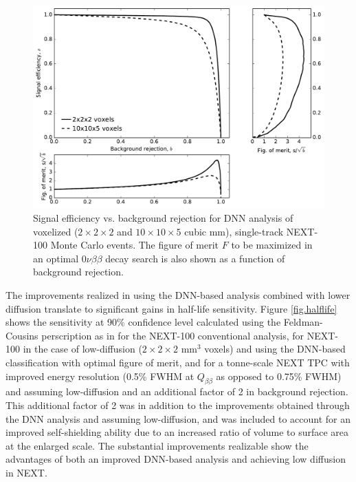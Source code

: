 \documentclass[a4paper,11pt]{article}
\begin{document}
\begin{figure}[!htb]
	\centering
	\includegraphics[scale=0.6]{fig/sigvsbg_DNN.pdf}
	\caption{\label{fig_svsb}Signal efficiency vs. background rejection for DNN analysis of voxelized ($2 \times 2 \times 2$ and $10 \times 10 \times 5$ cubic mm), single-track NEXT-100 Monte Carlo events.  The figure of
		merit $F$ to be maximized in an optimal $0\nu\beta\beta$ decay search is also shown as a function of background rejection.}
\end{figure}

The improvements realized in using the DNN-based analysis combined with lower diffusion translate to significant gains in half-life sensitivity.  Figure \ref{fig.halflife} shows the sensitivity at 90\% confidence level calculated using the Feldman-Cousins \cite{Feldman_1998} perscription as in \cite{NEXT_sensitivity} for the NEXT-100 conventional analysis, for NEXT-100 in the case of low-diffusion ($2 \times 2 \times 2$ mm$^3$ voxels) and using the DNN-based classification with optimal figure of merit, and for a tonne-scale NEXT TPC with improved energy resolution (0.5\% FWHM at $Q_{\beta\beta}$ as opposed to 0.75\% FWHM) and assuming low-diffusion and an additional factor of 2 in background rejection.  This additional factor of 2 was in addition to the improvements obtained through the DNN analysis and assuming low-diffusion, and was included to account for an improved self-shielding ability due to an increased ratio of volume to surface area at the enlarged scale.  The substantial improvements realizable show the advantages of both an improved DNN-based analysis and achieving low diffusion in NEXT.
\end{document}
